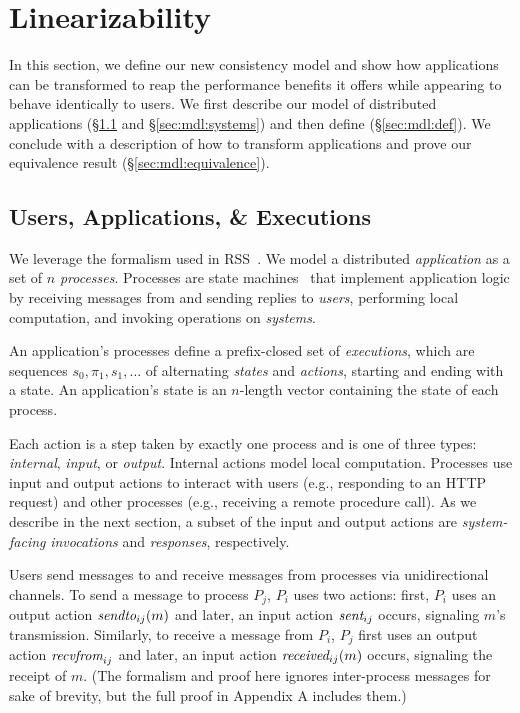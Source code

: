 \section{\Multidispatch{} Linearizability}
\label{sec:mdl}

In this section, we define our new consistency model and show how
applications can be transformed to reap the performance benefits it offers while appearing to behave identically to users.
We first describe our model of distributed applications
(\S\ref{sec:mdl:applications} and \S\ref{sec:mdl:systems}) and then define \MDL{} (\S\ref{sec:mdl:def}). We conclude with a description
of how to transform applications and prove our equivalence result
(\S\ref{sec:mdl:equivalence}).

\subsection{Users, Applications, \& Executions}
\label{sec:mdl:applications}

We leverage the formalism used in RSS~\cite{helt2021rss}. We model a
distributed \textit{application} as a set of $n$ \textit{processes}.
Processes are state machines~\cite{lynch1987ioa,lynch1996da}
that implement application logic by receiving messages from and sending replies
to \textit{users}, performing local computation,
and invoking operations on \textit{systems}.

An application's processes define a prefix-closed set of \textit{executions},
which are sequences $s_0,\pi_1,s_1,\ldots$ of alternating \textit{states} and
\textit{actions}, starting and ending with a state. An application's state
is an $n$-length vector containing the state of each process.

Each action is a step taken by exactly one process and is one of three types:
\textit{internal}, \textit{input}, or \textit{output}. Internal actions model
local computation. Processes use input and output actions to interact with
users (e.g., responding to an HTTP request) and other
processes (e.g., receiving a remote procedure call).
As we describe in the next section, a subset of the input and output actions
are \textit{system-facing} \textit{invocations} and \textit{responses}, 
respectively.

Users send messages to and receive messages from processes via unidirectional
channels. To send a message to process $P_j$, $P_i$ uses two
actions: first, $P_i$ uses an output action $\operatorname*{\operatorname*{\textit{sendto}}}_{ij}(m)$
and later, an input action $\operatorname*{\textit{sent}}_{ij}$ occurs, signaling $m$'s 
transmission. Similarly, to receive a message from $P_i$, $P_j$ first
uses an output action $\operatorname*{\textit{recvfrom}}_{ij}$ and later, an input action
$\operatorname*{\textit{received}}_{ij}(m)$ occurs, signaling the receipt of $m$.
(The formalism and proof here ignores inter-process messages for sake of brevity, but the full
proof in Appendix A includes them.)

